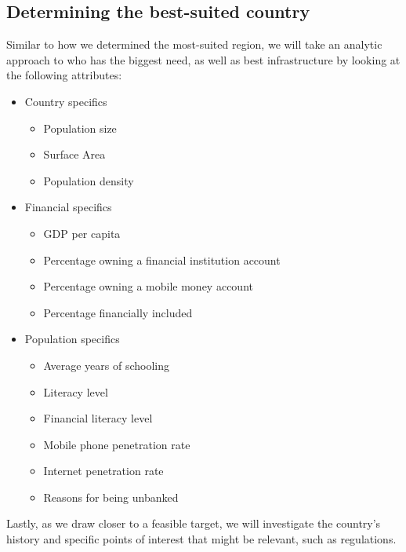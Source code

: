 \documentclass[11pt, a4paper]{article}
\begin{document}
\subsection{Determining the best-suited country} %
\label{sub:determining_the_best_suited_country}
Similar to how we determined the most-suited region, we will take an analytic approach to who has the biggest need, as well as best infrastructure by looking at the following attributes:

\begin{itemize}
  \item Country specifics
  \begin{itemize}
  \item Population size
  \item Surface Area
  \item Population density
  \end{itemize}
  \item Financial specifics
  \begin{itemize}
  \item GDP per capita
  \item Percentage owning a financial institution account
  \item Percentage owning a mobile money account
  \item Percentage financially included
  \end{itemize}
  \item Population specifics
  \begin{itemize}
  \item Average years of schooling
  \item Literacy level
  \item Financial literacy level
  \item Mobile phone penetration rate
  \item Internet penetration rate
  \item Reasons for being unbanked
  \end{itemize}
\end{itemize}
Lastly, as we draw closer to a feasible target, we will investigate the country's history and specific points of interest that might be relevant, such as regulations.
\end{document}
